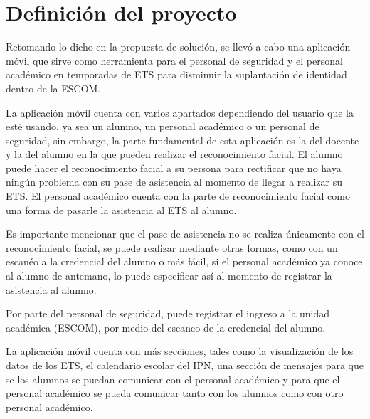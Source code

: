\chapter{Definición del proyecto}
Retomando lo dicho en la propuesta de solución, se llevó a cabo una aplicación móvil que sirve como herramienta para el personal de seguridad y el personal académico en temporadas de ETS para disminuir la suplantación de identidad dentro de la ESCOM. 

La aplicación móvil cuenta con varios apartados dependiendo del usuario que la esté usando, ya sea un alumno, un personal académico o un personal de seguridad, sin embargo, la parte fundamental de esta aplicación es la del docente y la del alumno en la que pueden realizar el reconocimiento facial. El alumno puede hacer el reconocimiento facial a su persona para rectificar que no haya ningún problema con su pase de asistencia al momento de llegar a realizar su ETS. El personal académico cuenta con la parte de reconocimiento facial como una forma de pasarle la asistencia al ETS al alumno. 

Es importante mencionar que el pase de asistencia no se realiza únicamente con el reconocimiento facial, se puede realizar mediante otras formas, como con un escanéo a la credencial del alumno o más fácil, si el personal académico ya conoce al alumno de antemano, lo puede especificar así al momento de registrar la asistencia al alumno. 

Por parte del personal de seguridad, puede registrar el ingreso a la unidad académica (ESCOM), por medio del escaneo de la credencial del alumno. 

La aplicación móvil cuenta con más secciones, tales como la visualización de los datos de los ETS, el calendario escolar del IPN, una sección de mensajes para que se los alumnos se puedan comunicar con el personal académico y para que el personal académico se pueda comunicar tanto con los alumnos como con otro personal académico. 